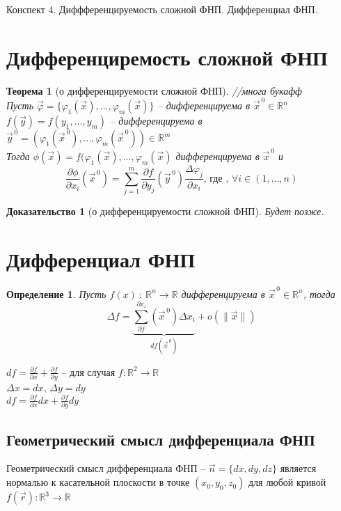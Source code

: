 \documentclass[a4paper, 12pt, titlepage, fleqn]{article}
\newtheorem{Def}{Определение}[section]
\newtheorem{Proof}{Доказательство}
\newtheorem{Th}{Теорема}
\newcommand{\Real}{\mathbb{R}}
\newcommand{\T}{\textbf}
\newcommand{\D}{\partial}
\newcommand{\Where}{\T{, где }}
\newcommand{\Indexes}{\T{, }\forall i \in (1, \dots, n)}
\begin{document}
	\begin{center}
		\begin{Large}
			Конспект 4. Диффференцируемость сложной ФНП. Дифференциал ФНП.
		\end{Large}
	\end{center}
	
	\section{Дифференциремость сложной ФНП}
		\begin{Th}[о дифференцируемости сложной ФНП]
			//многа букафф\\
			Пусть $\vec{\varphi} = \{\varphi_1(\vec{x}), \dots, \varphi_m(\vec{x})\}$ -- дифференцируема в $\vec{x}^{\,0} \in \Real^n$ \\
			$f(\vec{y}) = f(y_1, \dots, y_m)$ -- дифференцируема в $\vec{y}^{\,0} = (\varphi_1(\vec{x}^{\,0}), \dots, \varphi_m(\vec{x}^{\,0})) \in \Real^m$\\
			Тогда $\phi(\vec{x}) = f(\varphi_1(\vec{x}), \dots, \varphi_m(\vec{x})$ дифференцируема в $\vec{x}^{\,0}$ и 
			\[
			\frac{\D \phi}{\D x_i}(\vec{x}^{\,0}) = \sum_{j = 1}^{m}\frac{\D f}{\D y_j}(\vec{y}^{\,0})\frac{\Delta\varphi_j}{\D x_i} \Where \Indexes
			\]
		\end{Th}
		\begin{Proof}[о дифференцируемости сложной ФНП]
			Будет позже.
		\end{Proof}
		\section{Дифференциал ФНП}
			\begin{Def}
				Пусть $f(x) \: \colon \: \Real^n \to \Real$ дифференцируема в $\vec{x}^{\,0} \in \Real^n$, тогда
				\[
					\Delta f = \underbrace{\sum_{\D f}^{\D x_i}(\vec{x}^{\,0})\Delta x_i}_{df(\vec{x}^{\,0})} + o(\|\vec{x}\|)
				\]
			\end{Def}
			$df = \frac{\D f}{\D x} + \frac{\D f}{\D y}$ -- для случая $f : \Real^2 \to \Real$\\
			$\Delta x = dx$, $\Delta y = dy$\\
			$df = \frac{\D f}{\D x}dx + \frac{\D f}{\D y}dy$\\
			\subsection{Геометрический смысл дифференциала ФНП}
				Геометрический смысл дифференциала ФНП -- $\vec{n} = \{dx, dy, dz\}$ является нормалью к касательной плоскости в точке $(x_0, y_0, z_0)$ для любой кривой $f(\vec{r}) : \Real^3 \to \Real$ 
\end{document}
